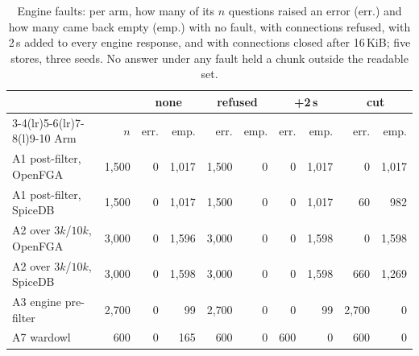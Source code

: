 \begin{table}[t]
\caption{Engine faults: per arm, how many of its $n$ questions raised an error (err.) and how many came back empty (emp.) with no fault, with connections refused, with 2\,s added to every engine response, and with connections closed after 16\,KiB; five stores, three seeds. No answer under any fault held a chunk outside the readable set.}
\label{tab:faults}
\footnotesize\setlength{\tabcolsep}{2.5pt}
\begin{tabular}{@{}lrrrrrrrrr@{}}
\toprule
 & & \multicolumn{2}{c}{none} & \multicolumn{2}{c}{refused} & \multicolumn{2}{c}{+2\,s} & \multicolumn{2}{c}{cut} \\
\cmidrule(lr){3-4}\cmidrule(lr){5-6}\cmidrule(lr){7-8}\cmidrule(l){9-10}
Arm & $n$ & err. & emp. & err. & emp. & err. & emp. & err. & emp. \\
\midrule
A1 post-filter, OpenFGA & 1{,}500 & 0 & 1{,}017 & 1{,}500 & 0 & 0 & 1{,}017 & 0 & 1{,}017 \\
A1 post-filter, SpiceDB & 1{,}500 & 0 & 1{,}017 & 1{,}500 & 0 & 0 & 1{,}017 & 60 & 982 \\
A2 over $3k$/$10k$, OpenFGA & 3{,}000 & 0 & 1{,}596 & 3{,}000 & 0 & 0 & 1{,}598 & 0 & 1{,}598 \\
A2 over $3k$/$10k$, SpiceDB & 3{,}000 & 0 & 1{,}598 & 3{,}000 & 0 & 0 & 1{,}598 & 660 & 1{,}269 \\
A3 engine pre-filter & 2{,}700 & 0 & 99 & 2{,}700 & 0 & 0 & 99 & 2{,}700 & 0 \\
A7 wardowl & 600 & 0 & 165 & 600 & 0 & 600 & 0 & 600 & 0 \\
\bottomrule
\end{tabular}
\end{table}

